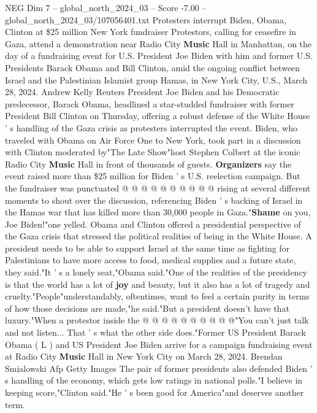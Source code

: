 \begin{textsample}{NEG Dim 7 – global\_north\_2024\_03 – Score -7.00 – global\_north\_2024\_03/107056401.txt}  \label{ex:f7_neg_237}
Protesters interrupt Biden, Obama, Clinton at \$25 million New York fundraiser Protestors, calling for ceasefire in Gaza, attend a demonstration near Radio City \textbf{Music} Hall in Manhattan, on the day of a fundraising event for U.S.
President Joe Biden with him and former U.S.
Presidents Barack Obama and Bill Clinton, amid the ongoing conflict between Israel and the Palestinian Islamist group Hamas, in New York City, U.S., March 28, 2024.
Andrew Kelly Reuters President Joe Biden and his Democratic predecessor, Barack Obama, headlined a star-studded fundraiser with former President Bill Clinton on Thursday, offering a robust defense of the White House ' s handling of the Gaza crisis as protesters interrupted the event.
Biden, who traveled with Obama on Air Force One to New York, took part in a discussion with Clinton moderated by"The Late Show"host Stephen Colbert at the iconic Radio City \textbf{Music} Hall in front of thousands of guests. \textbf{Organizers} say the event raised more than \$25 million for Biden ' s U.S. reelection campaign.
But the fundraiser was punctuated @ @ @ @ @ @ @ @ @ @ rising at several different moments to shout over the discussion, referencing Biden ' s backing of Israel in the Hamas war that has killed more than 30,000 people in Gaza."\textbf{Shame} on you, Joe Biden!"one yelled.
Obama and Clinton offered a presidential perspective of the Gaza crisis that stressed the political realities of being in the White House.
A president needs to be able to support Israel at the same time as fighting for Palestinians to have more access to food, medical supplies and a future state, they said."It ' s a lonely seat,"Obama said."One of the realities of the presidency is that the world has a lot of \textbf{joy} and beauty, but it also has a lot of tragedy and cruelty."People"understandably, oftentimes, want to feel a certain purity in terms of how those decisions are made,"he said."But a president doesn't have that luxury."When a protestor inside the @ @ @ @ @ @ @ @ @ @"You can't just talk and not listen...
That ' s what the other side does."Former US President Barack Obama ( L ) and US President Joe Biden arrive for a campaign fundraising event at Radio City \textbf{Music} Hall in New York City on March 28, 2024.
Brendan Smialowski Afp Getty Images The pair of former presidents also defended Biden ' s handling of the economy, which gets low ratings in national polls."I believe in keeping score,"Clinton said."He ' s been good for America"and deserves another term.

\end{textsample}
